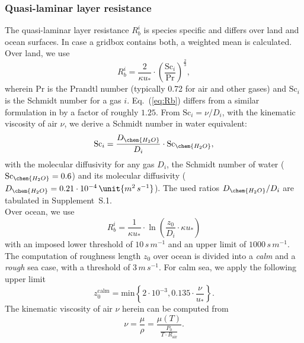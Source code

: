 \documentclass[gmd, manuscript]{copernicus}
\begin{document}
\subsubsection{Quasi-laminar layer resistance}
\label{subsubsec:Rb}
The quasi-laminar layer resistance $R_b^i$ is species specific and differs over land and ocean surfaces. In case a gridbox contains both, a weighted mean is calculated.
Over land, we use \citep[Eq.~(53),][]{ACP:Simpson2012}
\begin{equation}
  R_b^i = \frac{2}{\kappa u_*} \cdot \left(\frac{\text{Sc}_i}{\text{Pr}}\right)^{\frac{2}{3}},
  \label{eq:Rb}
\end{equation}
wherein $\text{Pr}$ is the Prandtl number (typically 0.72 for air and other gases) and $\text{Sc}_i$ is the Schmidt number for a gas $i$. Eq.~(\ref{eq:Rb}) differs from a similar formulation in \citet{ACP:Seinfeld2006} by a factor of roughly $1.25$. From $\text{Sc}_i = \nu/D_i$, with the kinematic viscosity of air $\nu$, we derive a Schmidt number in water equivalent:
\begin{equation}
  \text{Sc}_i = \frac{D_\chem{H_2O}}{D_i} \cdot \text{Sc}_\chem{H_2O},
\end{equation}
with the molecular diffusivity for any gas $D_i$, the Schmidt number of water ($\text{Sc}_\chem{H_2O}=0.6$) and its molecular diffusivity ($D_\chem{H_2O}=0.21\cdot10^{-4}\,\unit{m^2\,s^{-1}}$). The used ratios $D_\chem{H_2O}/D_i$ are tabulated in Supplement~S.1.\\
%
Over ocean, we use \citep[Eq.~(54),][]{ACP:Simpson2012}
\begin{equation}
  R_b^i = \frac{1}{\kappa u_*}\cdot\ln\left({\frac{z_0}{D_i}\cdot \kappa u_*}\right)
\end{equation}
with an imposed lower threshold of $10\,\unit{s\,m^{-1}}$ and an upper limit of $1000\,\unit{s\,m^{-1}}$. The computation of roughness length $z_0$ over ocean is divided into a \emph{calm} and a \emph{rough} sea case, with a threshold of $3\,\unit{m\,s^{-1}}$. For calm sea, we apply the following upper limit \citep[][with a slightly higher coefficient of $0.135$]{Hinze1975,Garratt1992}
\begin{equation}
  z_0^\text{calm} = \text{min}\left\{2\cdot10^{-3}, 0.135 \cdot \frac{\nu}{u_*}\right\}.
\end{equation}
The kinematic viscosity of air $\nu$ herein can be computed from 
\begin{equation}
  \nu = \frac{\mu}{\rho} = \frac{\mu(T)}{\frac{P_0}{T\cdot R_\text{air}}}.
  \label{eq:kinematic_viscosity}
\end{equation}
\end{document}
